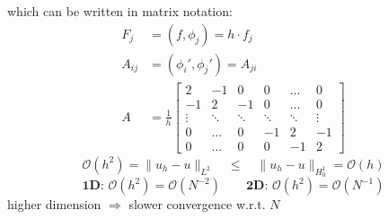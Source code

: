         which can be written in matrix notation:
        \begin{align*}
            F_j &= (f,\phi_j) = h \cdot f_j\\
            A_{ij} &= (\phi_i', \phi_j') = A_{ji}\\
            A &= \frac{1}{h}
            \begin{bmatrix}
                2 & -1 &  0 & 0 & \dots & 0 \\
                -1 &  2 & -1 & 0 & \dots & 0 \\
                \vdots & \ddots & \ddots & \ddots & \ddots & \vdots \\
                0 & \dots & 0 & -1 &  2 & -1 \\
                0 & \dots & 0 & 0 &  -1 &  2 
            \end{bmatrix}
        \end{align*}
            \vspace{1em}
            $$
                \mathcal{O}(h^2) = \lVert u_h - u \rVert_{L^2}\quad \leq \quad \lVert u_h - u \rVert_{H_0^1} = \mathcal{O}(h)%
            $$
            $$
                \textbf{1D: } \mathcal{O}(h^2) = \mathcal{O}(N^{-2}) \qquad \textbf{2D: } \mathcal{O}(h^2) = \mathcal{O}(N^{-1})
            $$
            higher dimension $\Rightarrow$ slower convergence w.r.t. $N$